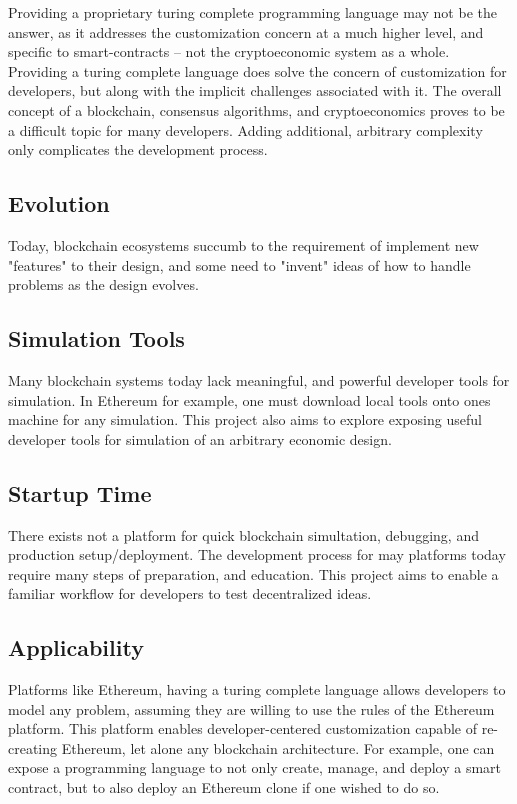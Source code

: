 \documentclass[12pt, titlepage, twocolumn]{report}
\begin{document}
Providing a proprietary turing complete programming language may not be the answer, as it addresses the customization concern at a much higher level, and specific to smart-contracts -- not the cryptoeconomic system as a whole. Providing a turing complete language does solve the concern of customization for developers, but along with the implicit challenges associated with it. The overall concept of a blockchain, consensus algorithms, and cryptoeconomics proves to be a difficult topic for many developers. Adding additional, arbitrary complexity only complicates the development process.   

\subsection{Evolution}
Today, blockchain ecosystems succumb to the requirement of implement new "features" to their design, and some need to "invent" ideas of how to handle problems as the design evolves. 

\subsection{Simulation Tools}
Many blockchain systems today lack meaningful, and powerful developer tools for simulation. In Ethereum for example, one must download local tools onto ones machine for any simulation. This project also aims to explore exposing useful developer tools for simulation of an arbitrary economic design.


\subsection{Startup Time}
There exists not a platform for quick blockchain simultation, debugging, and production setup/deployment. The development process for may platforms today require many steps of preparation, and education. This project aims to enable a familiar workflow for developers to test decentralized ideas.


\subsection{Applicability}
Platforms like Ethereum, having a turing complete language allows developers to model any problem, assuming they are willing to use the rules of the Ethereum platform. This platform enables developer-centered customization capable of re-creating Ethereum, let alone any blockchain architecture. For example, one can expose a programming language to not only create, manage, and deploy a smart contract, but to also deploy an Ethereum clone if one wished to do so.
 
\end{document}
